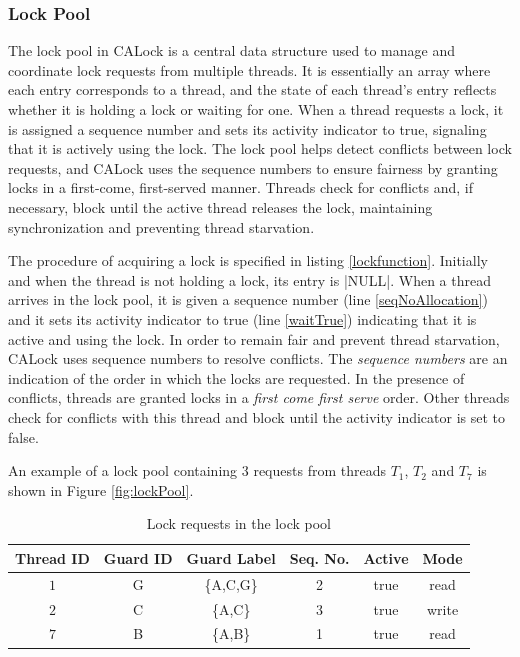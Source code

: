 \subsubsection{Lock Pool}

The lock pool in CALock is a central data structure used to manage and coordinate lock requests from multiple threads. It is essentially an array where each entry corresponds to a thread, and the state of each thread’s entry reflects whether it is holding a lock or waiting for one. When a thread requests a lock, it is assigned a sequence number and sets its activity indicator to true, signaling that it is actively using the lock. The lock pool helps detect conflicts between lock requests, and CALock uses the sequence numbers to ensure fairness by granting locks in a first-come, first-served manner. Threads check for conflicts and, if necessary, block until the active thread releases the lock, maintaining synchronization and preventing thread starvation.

The procedure of acquiring a lock is specified in listing \ref{lockfunction}. Initially and when the thread is not holding a lock, its entry is \inline|NULL|. When a thread arrives in the lock pool, it is given a sequence number (line \ref{seqNoAllocation}) and it sets its activity indicator to true (line \ref{waitTrue}) indicating that it is active and using the lock. In order to remain fair and prevent thread starvation, CALock uses sequence numbers to resolve conflicts. The \emph{sequence numbers} are an indication of the order in which the locks are requested. In the presence of conflicts, threads are granted locks in a \emph{first come first serve} order. Other threads check for conflicts with this thread and block until the activity indicator is set to false.

An example of a lock pool containing 3 requests from threads $T_1$, $T_2$ and $T_7$ is shown in Figure \ref{fig:lockPool}. 

\begin{table}[H]
	\centering
	\captionsetup{justification=centering}
	\begin{tabular}{cccccc}
		\textbf{Thread ID} & \textbf{Guard ID}& \textbf{Guard Label} & \textbf{Seq. No.} & \textbf{Active} & \textbf{Mode} \\
		\hline
		$1$ & G &\{A,C,G\} & 2 & true & read\\
		$2$ & C &\{A,C\} & 3   & true & write\\
		$7$ & B &\{A,B\} &  1  & true & read\\
	\end{tabular}
	\caption{Lock requests in the lock pool}
	\label{lockPoolTable}
\end{table}



